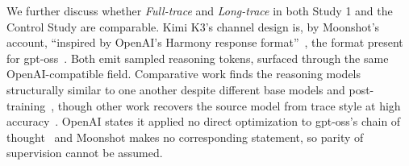 \documentclass[manuscript,review,anonymous]{acmart}
\begin{document}


We further discuss whether \textit{Full-trace} and \textit{Long-trace} in both Study 1 and the Control Study are comparable. Kimi K3's channel design is, by Moonshot's account, ``inspired by OpenAI's Harmony response format''~\cite{kimi2026k3report}, the format present for
gpt-oss~\cite{openai2025harmony}. Both emit sampled reasoning tokens, surfaced through the same OpenAI-compatible field. Comparative work 
finds the reasoning models structurally similar to one another despite different
base models and post-training~\cite{lee2026reasoningflow}, though other work recovers the source model from trace style at high accuracy~\cite{chen2025lot}.
OpenAI states it applied no direct optimization to gpt-oss's chain of thought~\cite{openai2025gptoss} and Moonshot makes no corresponding statement, so
parity of supervision cannot be assumed. 
\end{document}
